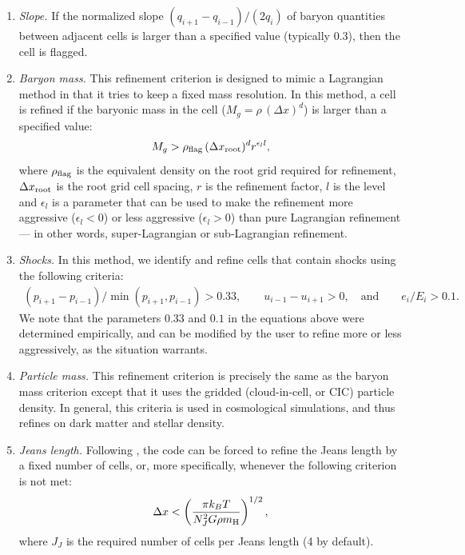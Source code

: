 \begin{enumerate}

\item{\em Slope.}  If the normalized slope $(q_{i+1} - q_{i-1})/ (2 q_i)$ of baryon quantities between adjacent cells is larger than a specified value (typically 0.3), then the cell is flagged.

\item{\em Baryon mass.}  This refinement criterion is designed to
  mimic a Lagrangian method in that it tries to keep a fixed mass
  resolution.  In this method, a cell is refined if the baryonic mass
  in the cell ($M_g = \rho\, (\Delta x)^d$) is larger than a specified value:
\begin{equation}
M_g > \rho_{\rm flag}\, (\Delta x_{\rm root})^d r^{\epsilon_l l},
\end{equation}
where $\rho_{\rm flag}$ is the equivalent density on the root grid
required for refinement, $\Delta x_{\rm root}$ is the root grid cell
spacing, $r$ is the refinement factor, $l$ is the level and
$\epsilon_l$ is a parameter that can be used to make the refinement
more aggressive ($\epsilon_l < 0$) or less aggressive ($\epsilon_l >
0$) than pure Lagrangian refinement --- in other words,
super-Lagrangian or sub-Lagrangian refinement.

\item{\em Shocks.}  In this method, we identify and refine cells that contain shocks using the following criteria:
\begin{eqnarray}
(p_{i+1} - p_{i-1})/\min(p_{i+1}, p_{i-1}) > 0.33,  \qquad
u_{i-1} - u_{i+1} > 0, \quad\text{and} \qquad
e_i / E_i > 0.1.  \nonumber
\end{eqnarray}
We note that the parameters $0.33$ and $0.1$ in the equations above were determined empirically, and can be modified by the user to refine more or less aggressively, as the situation warrants.

\item{\em Particle mass.}  This refinement criterion is precisely the same as the baryon mass criterion except that it uses the gridded (cloud-in-cell, or CIC) particle density.  In general, this criteria is used in cosmological simulations, and thus refines on dark matter and stellar density.

\item{\em Jeans length.}  Following \cite{Truelove98}, the code can be forced to refine the Jeans length by a fixed number of cells, or, more specifically, whenever the following criterion is not met:
\begin{equation}
\Delta x < \left( \frac{\pi k_B T}{N_J^2 G \rho \mh} \right)^{1/2},
\end{equation}
where $J_J$ is the required number of cells per Jeans length (4 by default).


\end{enumerate}
